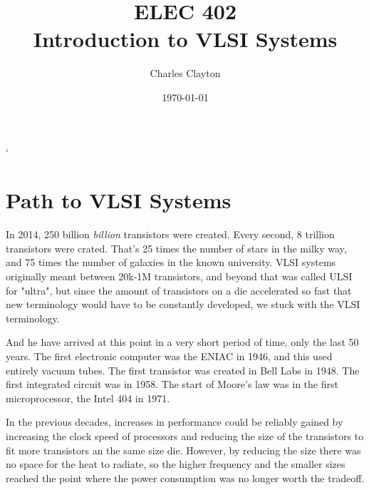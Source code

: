 \documentclass{article}
\begin{document}


\title{\huge ELEC 402 \\ \Large \medskip Introduction to VLSI Systems}
\author{Charles Clayton}
\date{\today}
\maketitle
`
\thispagestyle{empty}

\setcounter{page}{0}



\singlespacing			\pagebreak
\tableofcontents		\pagebreak

\listoffigures		
\listoftables
\listofmyequations
\pagebreak



\printnoidxglossaries	\pagebreak



\singlespacing

\section{Path to VLSI Systems}

In 2014, 250 billion \textit{billion} transistors were created. Every second, 8 trillion transistors were crated. That's 25 times the number of stars in the milky way, and 75 times the number of galaxies in the known university. VLSI systems originally meant between 20k-1M transistors, and beyond that was called ULSI for "ultra", but since the amount of transistors on a die accelerated so fast that new terminology would have to be constantly developed, we stuck with the VLSI terminology.

And he have arrived at this point in a very short period of time, only the last 50 years. The first electronic computer was the ENIAC in 1946, and this used entirely vacuum tubes. The first transistor was created in Bell Labs in 1948. The first integrated circuit was in 1958. The start of Moore's law was in the first microprocessor, the Intel 404 in 1971.

In the previous decades, increases in performance could be reliably gained by increasing the clock speed of processors and reducing the size of the transistors to fit more transistors an the same size die. However, by reducing the size there was no space for the heat to radiate, so the higher frequency and the smaller sizes reached the point where the power consumption was no longer worth the tradeoff. 
\end{document}
